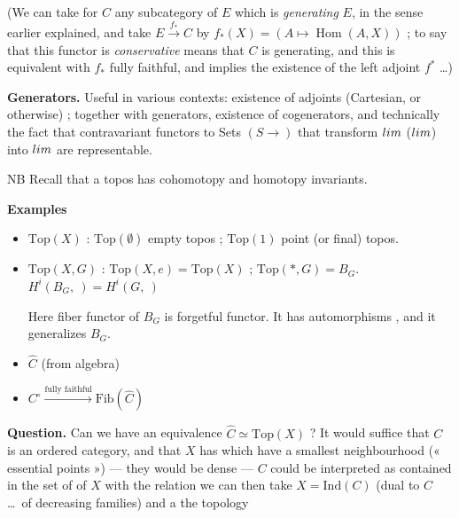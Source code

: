 \documentclass[11pt,a4paper]{article}
\begin{document}
(We can take for $C$ any subcategory of $E$ which is \emph{generating} $E$, in
the sense earlier explained, and take $E \xrightarrow{f_{*}} \widehat{C}$ by
 $f_{*}(X) = (A \mapsto \operatorname{Hom}(A, X))$ ;
to say that this functor is \emph{conservative} means that $C$ is generating, and
this  is equivalent with $f_{*}$ fully faithful, and implies
the existence of the left adjoint $f^{*}$ …)

\textbf{Generators.} Useful in various contexts: existence of adjoints
(Cartesian, or otherwise) \struck{\ill{}} ; together with generators, existence
of cogenerators, and technically the fact that  contravariant
functors to Sets $(S \to)$ that transform $\varinjlim$ ($\varprojlim$) into
$\varprojlim$ are representable.

NB Recall that a topos has cohomotopy and homotopy invariants.

\textbf{Examples}
\begin{itemize}
\item $\mathrm{Top}(X)$ : $\mathrm{Top}(\emptyset)$ empty topos ;
$\mathrm{Top}(1)$ point (or final) topos.
\item $\mathrm{Top}(X, G)$ : $\mathrm{Top}(X, e) = \mathrm{Top}(X)$ ;
$\mathrm{Top}(*, G) = B_{G}$. $H^{i}(B_{G}, \ ) = H^{i}(G, \ )$

Here fiber functor of $B_{G}$ is forgetful functor. It has automorphisms
\ill{}, and it \ill{} generalizes $B_{G}$.
\item $\widehat{C}$ (from algebra)
\item $C^{\circ} \xrightarrow{\text{fully faithful}} \mathrm{Fib}(\widehat{C})$
\end{itemize}

\textbf{Question.} Can we have an equivalence
$\widehat{C} \simeq \mathrm{Top}(X)$ \struck{\ill{}} ? It would suffice that $C$
is an ordered category, \struck{\ill{}} and that $X$ has \ill{} which have a
smallest neighbourhood (« essential points ») --- they would be
 dense --- $C$ could be interpreted as contained in the set of
\ill{} of $X$ with the \ill{} \ill{} relation \ill{} we can then take
$X = \mathrm{Ind}(C)$ (dual to $C$ …\ of decreasing families) and a
\ill{} the topology \ill{}

\end{document}
